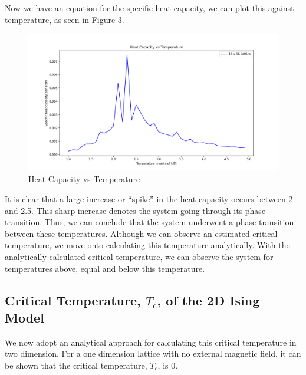 \documentclass[a4paper]{article}
\begin{document}
Now we have an equation for the specific heat capacity, we can plot this against temperature, as seen in Figure 3. 

\begin{figure}[h!]
  \includegraphics[scale=0.3, center]{heat capacity vs temperature.png}
  \caption{Heat Capacity vs Temperature}
  \label{fig:estimated_mean}
\end{figure} 

It is clear that a large increase or “spike” in the heat capacity occurs between 2 and 2.5. This sharp increase denotes the system going through its phase transition. Thus, we can conclude that the system underwent a phase transition between these temperatures. Although we can observe an estimated critical temperature, we move onto calculating this temperature analytically. With the analytically calculated critical temperature, we can observe the system for temperatures above, equal and below this temperature.

\subsection{Critical Temperature, $T_{c}$, of the 2D Ising Model}

We now adopt an analytical approach for calculating this critical temperature in two dimension. For a one dimension lattice with no external magnetic field, it can be shown that the critical temperature, $T_{c}$, is 0. 
\end{document}
